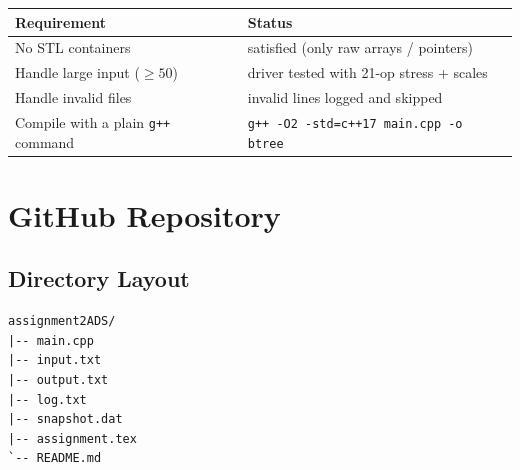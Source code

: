 \documentclass[11pt,a4paper]{article}
\begin{document}
\begin{center}
\begin{tabular}{ll}
\toprule
Requirement & Status \\
\midrule
No STL containers                                 & satisfied (only raw arrays / pointers) \\
Handle large input ($\geq 50$)                    & driver tested with 21-op stress + scales \\
Handle invalid files                              & invalid lines logged and skipped \\
Compile with a plain \texttt{g++} command         & \texttt{g++ -O2 -std=c++17 main.cpp -o btree} \\
\bottomrule
\end{tabular}
\end{center}

\section{GitHub Repository}

\begin{center}
\end{center}

\subsection*{Directory Layout}
\begin{lstlisting}[style=plain]
assignment2ADS/
|-- main.cpp
|-- input.txt
|-- output.txt
|-- log.txt
|-- snapshot.dat
|-- assignment.tex
`-- README.md
\end{lstlisting}
\end{document}
